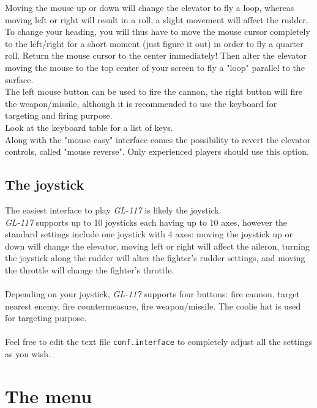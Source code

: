 Moving the mouse up or down will change the elevator to fly a loop, whereas
moving left or right will result in a roll, a slight movement will
affect the rudder.\\
To change your heading, you will thus have to move the mouse cursor completely
to the left/right for a short moment (just figure it out) in order to fly a
quarter roll. Return the mouse cursor to the center immediately!
Then alter the elevator moving the mouse to the top center of your screen to
fly a "loop" parallel to the surface.\\
The left mouse button can be used to fire the cannon, the right button will
fire the weapon/missile, although it is recommended to use the keyboard for
targeting and firing purpose.\\
Look at the keyboard table for a list of keys.\\
Along with the "mouse easy" interface comes the possibility to revert the
elevator controls, called "mouse reverse". Only experienced players should
use this option.


\subsection{The joystick}
\label{subsec:joystick}

The easiest interface to play \emph{GL-117} is likely the joystick.\\
\emph{GL-117} supports up to 10 joysticks each having up to 10 axes,
however the standard settings include one joystick with 4 axes:
moving the joystick up or down will change the elevator, moving left or right
will affect the aileron, turning the joystick along the rudder will alter
the fighter's rudder settings, and moving the throttle will change
the fighter's throttle.\\\\
Depending on your joystick, \emph{GL-117} supports four buttons:
fire cannon, target nearest enemy, fire countermeasure, fire weapon/missile.
The coolie hat is used for targeting purpose.\\\\
Feel free to edit the text file \texttt{conf.interface} to completely
adjust all the settings as you wish.


\section{The menu}
\label{sec:menu}

